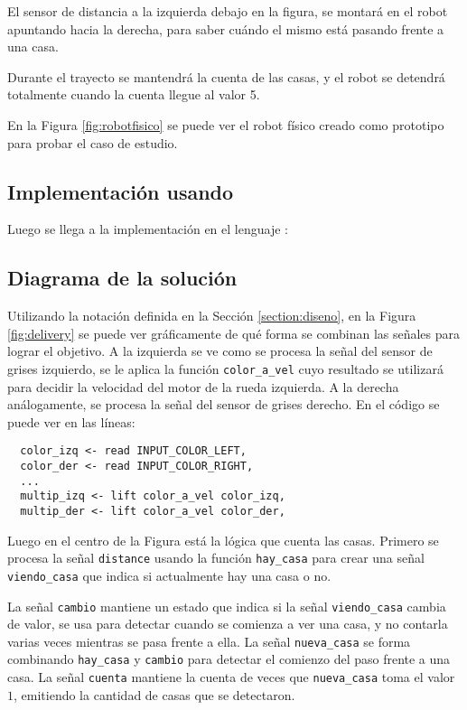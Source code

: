   El sensor de distancia a la izquierda debajo en la figura, se montará
en el robot apuntando hacia la derecha, para saber cuándo el mismo
está pasando frente a una casa.

  Durante el trayecto se mantendrá la cuenta de las casas, y el robot
se detendrá totalmente cuando la cuenta llegue al valor 5.

  En la Figura \ref{fig:robotfisico} se puede ver el
robot físico creado como prototipo para probar el caso de estudio.



\newpage
\subsection{Implementación usando \frob{}}
  Luego se llega a la implementación en el lenguaje \frob{}:



\subsection{Diagrama de la solución}



  Utilizando la notación definida en la Sección \ref{section:diseno},
en la Figura \ref{fig:delivery} se puede ver gráficamente de qué forma
se combinan las señales para lograr el objetivo.
  A la izquierda se ve como se procesa la señal del sensor de grises
izquierdo, se le aplica la función \texttt{color\_a\_vel} cuyo resultado
se utilizará para decidir la velocidad del motor de la rueda izquierda.
  A la derecha análogamente, se procesa la señal del sensor de grises
derecho. En el código se puede ver en las líneas:

  \begin{verbatim}
  color_izq <- read INPUT_COLOR_LEFT,
  color_der <- read INPUT_COLOR_RIGHT,
  ...
  multip_izq <- lift color_a_vel color_izq,
  multip_der <- lift color_a_vel color_der,
  \end{verbatim}
  
  Luego en el centro de la Figura está la lógica que cuenta las casas.
  Primero se procesa la señal \texttt{distance} usando la función
\texttt{hay\_casa} para crear una señal \texttt{viendo\_casa}
que indica si actualmente hay una casa o no.

  La señal \texttt{cambio} mantiene un estado que indica si la
señal \texttt{viendo\_casa} cambia de valor, se usa para detectar
cuando se comienza a ver una casa, y no contarla varias veces
mientras se pasa frente a ella.
  La señal \texttt{nueva\_casa} se forma combinando \texttt{hay\_casa}
y \texttt{cambio} para detectar el comienzo del paso frente a una casa.
  La señal \texttt{cuenta} mantiene la cuenta de veces
que \texttt{nueva\_casa} toma el valor $1$, emitiendo la cantidad
de casas que se detectaron.

